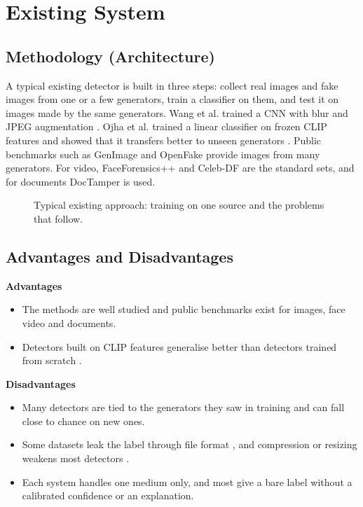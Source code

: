 \documentclass[12pt,a4paper]{article}
\begin{document}
\section{Existing System}
\subsection{Methodology (Architecture)}
A typical existing detector is built in three steps: collect real images and fake images from one or a few generators, train a classifier on them, and test it on images made by the same generators. Wang et al. trained a CNN with blur and JPEG augmentation \cite{wang}. Ojha et al. trained a linear classifier on frozen CLIP features and showed that it transfers better to unseen generators \cite{ojha}. Public benchmarks such as GenImage \cite{genimage} and OpenFake \cite{openfake} provide images from many generators. For video, FaceForensics++ \cite{rossler} and Celeb-DF \cite{celebdf} are the standard sets, and for documents DocTamper \cite{doctamper} is used.

\begin{figure}[htbp]
  \centering
  
  \caption{Typical existing approach: training on one source and the problems that follow.}
\end{figure}

\subsection{Advantages and Disadvantages}
\textbf{Advantages}
\begin{itemize}
  \item The methods are well studied and public benchmarks exist for images, face video and documents.
  \item Detectors built on CLIP features generalise better than detectors trained from scratch \cite{ojha}.
\end{itemize}
\textbf{Disadvantages}
\begin{itemize}
  \item Many detectors are tied to the generators they saw in training and can fall close to chance on new ones.
  \item Some datasets leak the label through file format \cite{grommelt}, and compression or resizing weakens most detectors \cite{corvi}.
  \item Each system handles one medium only, and most give a bare label without a calibrated confidence or an explanation.
\end{itemize}
\end{document}
